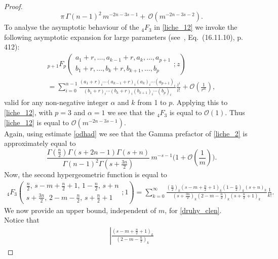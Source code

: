 \documentclass{article}
\theoremstyle{boldremark}
\renewcommand\[{\begin{equation}}
\renewcommand\]{\end{equation}}
\theoremstyle{definition}
\numberwithin{equation}{section}
\begin{document}
\begin{proof}
$${\pi\,\Gamma(n-1)^2}
\, m^{-2n-3s-1} + \,\mathcal{O}(m^{-2n-3s-2}).
$$
To analyse the asymptotic behaviour of the $_4F_3$ in \eqref{liche_12} we invoke the following asymptotic expansion for large parameters (see~\cite{olver2010nist}, Eq.~(16.11.10), p. 412):
\begin{multline}
{}_{{p+1}}F_{p}\!\left(
\begin{matrix}
a_1+r,\ldots,a_{k-1}+r,a_k,\ldots,a_{p+1} \\
b_1+r,\ldots,b_k+r,b_{k+1},\ldots,b_p
\end{matrix}
; z
\right) \\
=
\sum_{i=0}^{\alpha-1}
\frac{
(a_1+r)_i \cdots (a_{k-1}+r)_i (a_k)_i \cdots (a_{p+1})_i
}{
(b_1+r)_i \cdots (b_k+r)_i (b_{k+1})_i \cdots (b_p)_i
}
\frac{z^i}{i!}
+ \mathcal{O}\!\left(\frac{1}{r^\alpha}\right),
\end{multline}
valid for any non-negative integer $\alpha$ and $k$ from 1 to $p$. Applying this to \eqref{liche_12}, with $p = 3$ and $\alpha = 1$ we see that the $_4F_3$ is equal to $\mathcal{O}(1)$.
Thus \eqref{liche_12} is equal to $\mathcal{O}(m^{-2n-3s - 1})$.\\
Again, using estimate \eqref{odhad} we see that the Gamma prefactor of \eqref{liche_2} is approximately equal to 
$$
\frac{\Gamma\!\left(\frac{n}{2}\right)\Gamma(s+2n-1)\Gamma(s+n)}
{\Gamma(n-1)^2\Gamma\!\left(s+\frac{3n}{2}\right)}
\, m^{-s-1}\biggl(1+\mathcal{O}\left(\frac{1}{m}\right)\biggr).
$$
Now, the second hypergeometric function is equal to 
\begin{equation} \label{druhy_clen}
\begin{aligned}
{}_4F_3 \left(
\begin{matrix}
\frac{n}{2}, \, s - m + \frac{n}{2} + 1, \, 1 - \frac{n}{2}, \, s + n \\
s + \frac{3n}{2}, \, 2 - m - \frac{n}{2}, \, s + \frac{n}{2} + 1
\end{matrix}
; 1 \right)
=
\sum_{k=0}^{\infty}
\frac{
\left(\frac{n}{2}\right)_k
\left(s - m + \frac{n}{2} + 1\right)_k
\left(1 - \frac{n}{2}\right)_k
(s+n)_k
}{
\left(s + \frac{3n}{2}\right)_k
\left(2 - m - \frac{n}{2}\right)_k
\left(s + \frac{n}{2} + 1\right)_k
}
\frac{1}{k!}.
\end{aligned}
\end{equation}
We now provide an upper bound, independent of $m$, for \eqref{druhy_clen}.\\ Notice that
\begin{align*}
\left|
\frac{
\left(s-m+\frac n2+1\right)_k
}{
\left(2-m-\frac n2\right)_k
}
\end{align*}
\end{proof}
\end{document}
